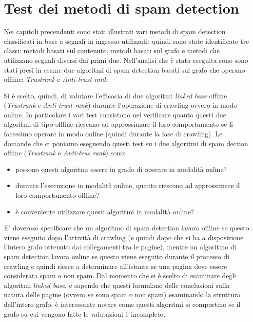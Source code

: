 \chapter{Test dei metodi di spam detection}
Nei capitoli precendenti sono stati illustrati vari metodi di spam detection classificati in base a segnali in ingresso utilizzati; quindi sono state identificate tre classi: metodi basati sul contenuto, metodi basati sul grafo e metodi che utilizzano segnali diversi dai primi due. Nell'analisi che è stata eseguita sono sono stati presi in esame due algoritmi di spam detection basati sul grafo che operano offline: \textit{Trustrank} e \textit{Anti-trust rank}. 

Si è scelto, quindi, di valutare l'efficacia di due  algoritmi \textit{linked base} offline (\textit{Trustrank} e \textit{Anti-trust rank}) durante l'operazione di crawling ovvero in modo online. In particolare i vari test consistono nel verificare quanto questi due algoritmi di tipo offline riescano ad approssimare il loro comportamento se li facessimo operare in modo online (quindi durante la fase di crawling). Le domande che ci poniamo eseguendo questi test su i due algoritmi di spam dection offline (\textit{Trustrank} e \textit{Anti-trus rank}) sono:
\begin{itemize}
 \item possono questi algoritmi essere in grado di operare in modalità online?
 \item durante l'esecuzione in modalità online, quanto riescono ad approssimare il loro comportamento offline?
 \item è conveniente utilizzare questi algoritmi in modalità online?
\end{itemize}

E' doveroso specificare che un algoritmo di spam detection lavora offline se questo viene eseguito dopo l'attività di crawling (e quindi dopo che si ha a disposizione l'intero grafo ottenuto dai collegamenti tra le pagine), mentre un algoritmo di spam detection lavora online se questo viene eseguito durante il processo di crawling e quindi riesce a determinare all'istante se una pagina deve essere considerata spam o non spam. Dal momento che si è scelto di esaminare degli algoritmi \textit{linked base}, e sapendo che questi formulano delle conclusioni sulla natura delle pagine (ovvero se sono spam o non spam) esaminando la struttura dell'intero grafo, è interessante notare come questi algoritmi si comportino se il grafo su cui vengono fatte le valutazioni è incompleto.

